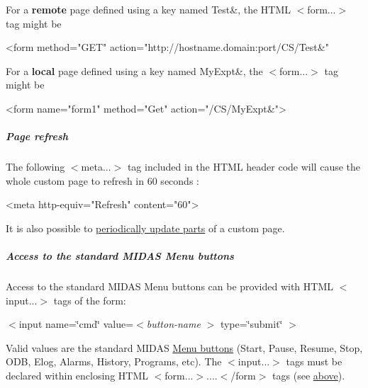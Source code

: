 \par
 For a {\bfseries remote} page defined using a key named Test\&, the HTML  $<$form...$>$  tag might be 
\begin{DoxyCode}
<form method="GET" action="http://hostname.domain:port/CS/Test&"\>
\end{DoxyCode}


For a {\bfseries local} page defined using a key named MyExpt\&, the $<$form...$>$ tag might be 
\begin{DoxyCode}
<form name="form1" method="Get" action="/CS/MyExpt&">
\end{DoxyCode}


\par






\label{RC_mhttpd_custom_features_idx_mhttpd_page_custom_refresh}
\hypertarget{RC_mhttpd_custom_features_idx_mhttpd_page_custom_refresh}{}
 \hypertarget{RC_mhttpd_custom_features_RC_mhttpd_custom_refresh}{}\subparagraph{Page refresh}\label{RC_mhttpd_custom_features_RC_mhttpd_custom_refresh}
The following $<$meta...$>$  tag included in the HTML header code will cause the whole custom page to refresh in 60 seconds :


\begin{DoxyCode}
<meta http-equiv="Refresh" content="60">
\end{DoxyCode}
 \par


It is also possible to \hyperlink{RC_mhttpd_custom_ODB_access_features_RC_mhttpd_js_update_part}{periodically update parts} of a custom page.



\hypertarget{RC_mhttpd_custom_features_RC_mhttpd_custom_midas_buttons}{}\subparagraph{Access to the standard MIDAS Menu buttons}\label{RC_mhttpd_custom_features_RC_mhttpd_custom_midas_buttons}
Access to the standard MIDAS Menu buttons can be provided with HTML $<$input...$>$ tags of the form:
\begin{DoxyItemize}
\item  $<$input name=\char`\"{}cmd\char`\"{} value=$<${\itshape button-\/name\/} $>$ type=\char`\"{}submit\char`\"{} $>$ 
\end{DoxyItemize}

Valid values are the standard MIDAS \hyperlink{RC_mhttpd_status_page_features_RC_mhttpd_status_menu_buttons}{Menu buttons} (Start, Pause, Resume, Stop, ODB, Elog, Alarms, History, Programs, etc). The $<$input...$>$ tags must be declared within enclosing HTML $<$form...$>$....$<$/form$>$  tags (see \hyperlink{RC_mhttpd_custom_features_RC_mhttpd_custom_key_access}{above}).

